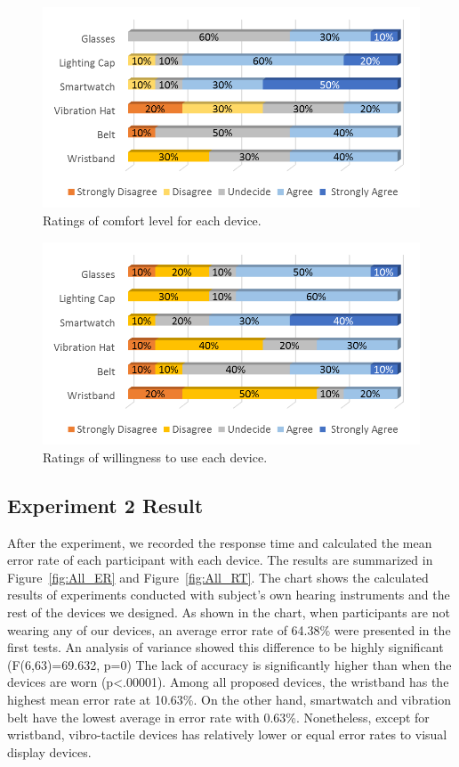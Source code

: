\documentclass{sigchi}
\begin{document}
\begin{figure}[!t]
\centering
\includegraphics[width=\columnwidth]{Likert_Comfortable}
\caption{Ratings of comfort level for each device.}
\label{fig:Likert_Comfortable}
\end{figure}

\begin{figure}[!t]
\centering
\includegraphics[width=\columnwidth]{Likert_Wanted}
\caption{Ratings of willingness to use each device.}
\label{fig:Likert_Wanted}
\end{figure}

\subsection{Experiment 2 Result}
After the experiment, we recorded the response time and calculated the mean error rate of each participant with each device. The results are summarized in Figure~\ref{fig:All_ER} and Figure~\ref{fig:All_RT}. The chart shows the calculated results of experiments conducted with subject's own hearing instruments and the rest of the devices we designed. As shown in the chart, when participants are not wearing any of our devices, an average error rate of 64.38\% were presented in the first tests. An analysis of variance showed this difference to be highly significant (F(6,63)=69.632, p=0) The lack of accuracy is significantly higher than when the devices are worn (p\textless.00001). Among all proposed devices, the wristband has the highest mean error rate at 10.63\%. On the other hand, smartwatch and vibration belt have the lowest average in error rate with 0.63\%. Nonetheless, except for wristband, vibro-tactile devices has relatively lower or equal error rates to visual display devices.
\end{document}
